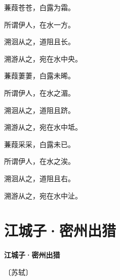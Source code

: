 \documentclass[12pt,UTF-8,openany,fontset=none]{ctexbook}
\begin{document}
\begin{center}
    \begin{Large}

        蒹葭苍苍，白露为霜。

        所谓伊人，在水一方。

        溯洄从之，道阻且长。

        溯游从之，宛在水中央。

        \vspace{18pt}  %

        蒹葭萋萋，白露未晞。

        所谓伊人，在水之湄。

        溯洄从之，道阻且跻。

        溯游从之，宛在水中坻。

        \vspace{18pt}  %

        蒹葭采采，白露未已。

        所谓伊人，在水之涘。

        溯洄从之，道阻且右。

        溯游从之，宛在水中沚。

    \end{Large}

\end{center}

\vspace{8pt}
\clearpage

\section{江城子·密州出猎}


\begin{center}
    {\bfseries 江城子·密州出猎}

    \vspace{18pt}

    \begin{large}\xuwen
        〔苏轼〕
    \end{large}

\end{center}

    \vspace{18pt}  %
\end{document}
